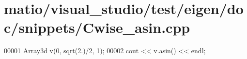 \hypertarget{matio_2visual__studio_2test_2eigen_2doc_2snippets_2_cwise__asin_8cpp_source}{}\section{matio/visual\+\_\+studio/test/eigen/doc/snippets/\+Cwise\+\_\+asin.cpp}
\label{matio_2visual__studio_2test_2eigen_2doc_2snippets_2_cwise__asin_8cpp_source}

\begin{DoxyCode}
00001 Array3d v(0, sqrt(2.)/2, 1);
00002 cout << v.asin() << endl;
\end{DoxyCode}
